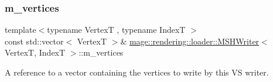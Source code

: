 \subsubsection{\texorpdfstring{m\+\_\+vertices}{m\_vertices}}
{\footnotesize\ttfamily template$<$typename VertexT , typename IndexT $>$ \\
const std\+::vector$<$ VertexT $>$\& \mbox{\hyperlink{classmage_1_1rendering_1_1loader_1_1_m_s_h_writer}{mage\+::rendering\+::loader\+::\+M\+S\+H\+Writer}}$<$ VertexT, IndexT $>$\+::m\+\_\+vertices\hspace{0.3cm}{\ttfamily [private]}}

A reference to a vector containing the vertices to write by this VS writer. 